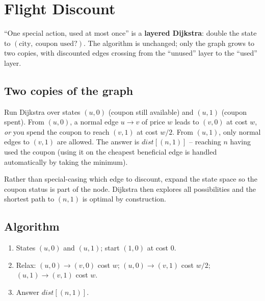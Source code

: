 \section{Flight Discount}
\label{sec:cses-flight-discount}


\begin{patternbox}
``One special action, used at most once'' is a \textbf{layered Dijkstra}:
double the state to $(\text{city},\ \text{coupon used?})$. The algorithm is
unchanged; only the graph grows to two copies, with discounted edges
crossing from the ``unused'' layer to the ``used'' layer.
\end{patternbox}

\subsection*{Two copies of the graph}

Run Dijkstra over states $(u,0)$ (coupon still available) and $(u,1)$
(coupon spent). From $(u,0)$, a normal edge $u\to v$ of price $w$ leads to
$(v,0)$ at cost $w$, \emph{or} you spend the coupon to reach $(v,1)$ at cost
$w/2$. From $(u,1)$, only normal edges to $(v,1)$ are allowed. The answer is
$\textit{dist}[(n,1)]$ -- reaching $n$ having used the coupon (using it on
the cheapest beneficial edge is handled automatically by taking the
minimum).

\begin{ideabox}
Rather than special-casing which edge to discount, expand the state space so
the coupon status is part of the node. Dijkstra then explores all
possibilities and the shortest path to $(n,1)$ is optimal by construction.
\end{ideabox}

\subsection*{Algorithm}

\begin{enumerate}
  \item States $(u,0)$ and $(u,1)$; start $(1,0)$ at cost $0$.
  \item Relax: $(u,0)\to(v,0)$ cost $w$; $(u,0)\to(v,1)$ cost $w/2$;
        $(u,1)\to(v,1)$ cost $w$.
  \item Answer $\textit{dist}[(n,1)]$.
\end{enumerate}

